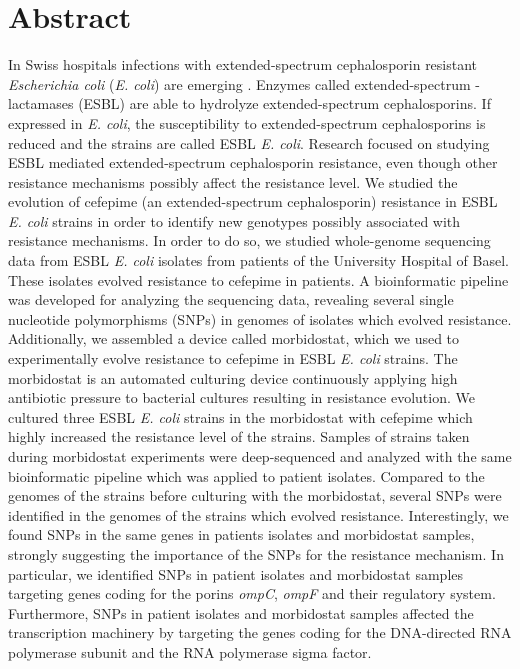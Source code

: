 \documentclass[12pt,twoside]{report}
\begin{document}
\chapter*{Abstract}
In Swiss hospitals infections with extended-spectrum cephalosporin resistant \textit{Escherichia coli} (\textit{E. coli}) are emerging \cite{swiss_hospitals}. Enzymes called extended-spectrum \textbeta-lactamases (ESBL) are able to hydrolyze extended-spectrum cephalosporins. If expressed in \textit{E. coli}, the susceptibility to extended-spectrum cephalosporins is reduced and the strains are called ESBL \textit{E. coli}. Research focused on studying ESBL mediated extended-spectrum cephalosporin resistance, even though other resistance mechanisms possibly affect the resistance level. We studied the evolution of cefepime (an extended-spectrum cephalosporin) resistance in ESBL \textit{E. coli} strains in order to identify new genotypes possibly associated with resistance mechanisms. In order to do so, we studied whole-genome sequencing data from ESBL \textit{E. coli} isolates from patients of the University Hospital of Basel. These isolates evolved resistance to cefepime in patients. A bioinformatic pipeline was developed for analyzing the sequencing data, revealing several single nucleotide polymorphisms (SNPs) in genomes of isolates which evolved resistance.
Additionally, we assembled a device called morbidostat, which we used to experimentally evolve resistance to cefepime in ESBL \textit{E. coli} strains. The morbidostat is an automated culturing device continuously applying high antibiotic pressure to bacterial cultures resulting in resistance evolution. We cultured three ESBL \textit{E. coli} strains in the morbidostat with cefepime which highly increased the resistance level of the strains. Samples of strains taken during morbidostat experiments were deep-sequenced and analyzed with the same bioinformatic pipeline which was applied to patient isolates. Compared to the genomes of the strains before culturing with the morbidostat, several SNPs were identified in the genomes of the strains which evolved resistance. Interestingly, we found SNPs in the same genes in patients isolates and morbidostat samples, strongly suggesting the importance of the SNPs for the resistance mechanism. In particular, we identified SNPs in patient isolates and morbidostat samples targeting genes coding for the porins \textit{ompC}, \textit{ompF} and their regulatory system. Furthermore, SNPs in patient isolates and morbidostat samples affected the transcription machinery by targeting the genes coding for the DNA-directed RNA polymerase subunit \textbeta \space and the RNA polymerase sigma factor.  
\end{document}
